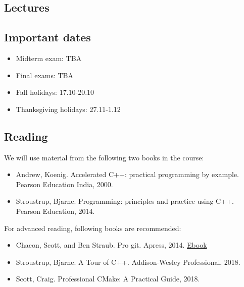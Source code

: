 \documentclass[11pt,letterpaper]{article}
\begin{document}
\subsection*{Lectures}

\subsection*{Important dates}
\begin{itemize}
\item Midterm exam: TBA
\item Final exams: TBA
\item Fall holidays: 17.10-20.10
\item Thanksgiving holidays: 27.11-1.12
\end{itemize}
\subsection*{Reading}

We will use material from the following two books in the course:

\begin{itemize}
\item Andrew, Koenig. Accelerated C++: practical programming by example. Pearson Education India, 2000.
\item Stroustrup, Bjarne. Programming: principles and practice using C++. Pearson Education, 2014.
\end{itemize}

For advanced reading, following books are recommended:

\begin{itemize}
\item Chacon, Scott, and Ben Straub. Pro git. Apress, 2014. \href{https://github.com/progit/progit2/releases/download/2.1.146/progit.pdf}{Ebook}
\item Stroustrup, Bjarne. A Tour of C++. Addison-Wesley Professional, 2018.
\item Scott, Craig. Professional CMake: A Practical Guide, 2018.
\end{itemize}
\end{document}
